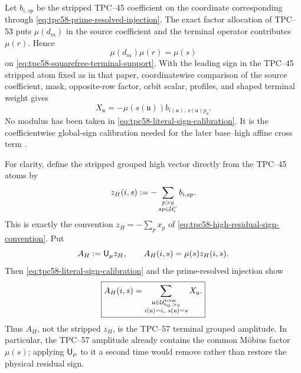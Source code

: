 Let \(b_{i,sp}\) be the stripped TPC--45 coefficient on the coordinate
corresponding through
\eqref{eq:tpc58-prime-resolved-injection}.  The exact factor allocation of
TPC--53 puts \(\mu(d_m)\) in the source coefficient and the terminal
operator contributes \(\mu(r)\).  Hence
\begin{equation}
 \mu(d_m)\mu(r)=\mu(s)
 \label{eq:tpc58-common-mobius-product}
\end{equation}
on \eqref{eq:tpc58-squarefree-terminal-support}.  With the leading sign in
the TPC--45 stripped atom fixed as in that paper, coordinatewise comparison
of the source coefficient, mask, opposite-row factor, orbit scalar,
profiles, and shaped terminal weight gives
\begin{equation}
 \boxed{
 X_{\mathfrak u}=-\mu(s(\mathfrak u))
 b_{i(\mathfrak u),\,s(\mathfrak u)p_{\mathfrak u}}.}
 \label{eq:tpc58-literal-sign-calibration}
\end{equation}
No modulus has been taken in
\eqref{eq:tpc58-literal-sign-calibration}.  It is the coefficientwise
global-sign calibration needed for the later base--high affine cross term
\citep{WangTPC45,WangTPC53}.

For clarity, define the stripped grouped high vector directly from the
TPC--45 atoms by
\begin{equation}
 z_H(i,s)
 :=-\sum_{\substack{p>y\\sp\in\mathcal U_i^\circ}}b_{i,sp}.
 \label{eq:tpc58-literal-stripped-high-vector}
\end{equation}
This is exactly the convention \(z_H=-\sum_p x_p\) of
\eqref{eq:tpc58-high-residual-sign-convention}.  Put
\begin{equation}
 A_H:=\mathsf U_\mu z_H,
 \qquad
 A_H(i,s)=\mu(s)z_H(i,s).
 \label{eq:tpc58-literal-physical-high-vector}
\end{equation}
Then \eqref{eq:tpc58-literal-sign-calibration} and the prime-resolved
injection show
\begin{equation}
 \boxed{
 A_H(i,s)
 =\sum_{\substack{\mathfrak u\in\mathcal U_{h_0,>y}^{\rm term}\\
                   i(\mathfrak u)=i,\ s(\mathfrak u)=s}}
   X_{\mathfrak u}.}
 \label{eq:tpc58-terminal-grouped-equals-physical-high}
\end{equation}
Thus \(A_H\), not the stripped \(z_H\), is the TPC--57 terminal grouped
amplitude.  In particular, the TPC--57 amplitude already contains the
common M\"obius factor \(\mu(s)\); applying \(\mathsf U_\mu\) to it a second time
would remove rather than restore the physical residual sign.

